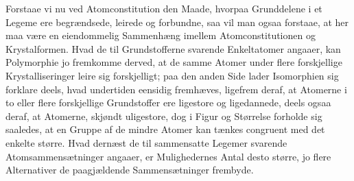 \documentclass[12pt,a4paper]{book}
\begin{document}
Forstaae vi nu ved Atomconstitution den Maade, hvorpaa
Grunddelene i et Legeme ere begrændsede, leirede og forbundne,
saa vil man ogsaa forstaae, at her maa være en eiendommelig
Sammenhæng imellem Atomconstitutionen og Krystalformen.
Hvad de til Grundstofferne svarende Enkeltatomer
angaaer, kan Polymorphie jo fremkomme derved, at de
samme Atomer under flere forskjellige Krystalliseringer leire
sig forskjelligt; paa den anden Side lader Isomorphien
sig forklare deels, hvad undertiden eensidig fremhæves, ligefrem
deraf, at Atomerne i to eller flere forskjellige Grundstoffer
ere ligestore og ligedannede, deels ogsaa deraf, at
Atomerne, skjøndt uligestore, dog i Figur og Størrelse forholde
sig saaledes, at en Gruppe af de mindre Atomer kan
tænkes congruent med det enkelte større. Hvad dernæst de
til sammensatte Legemer svarende Atomsammensætninger angaaer,
er Mulighedernes Antal desto større, jo flere Alternativer
de paagjældende Sammensætninger frembyde.
\end{document}
